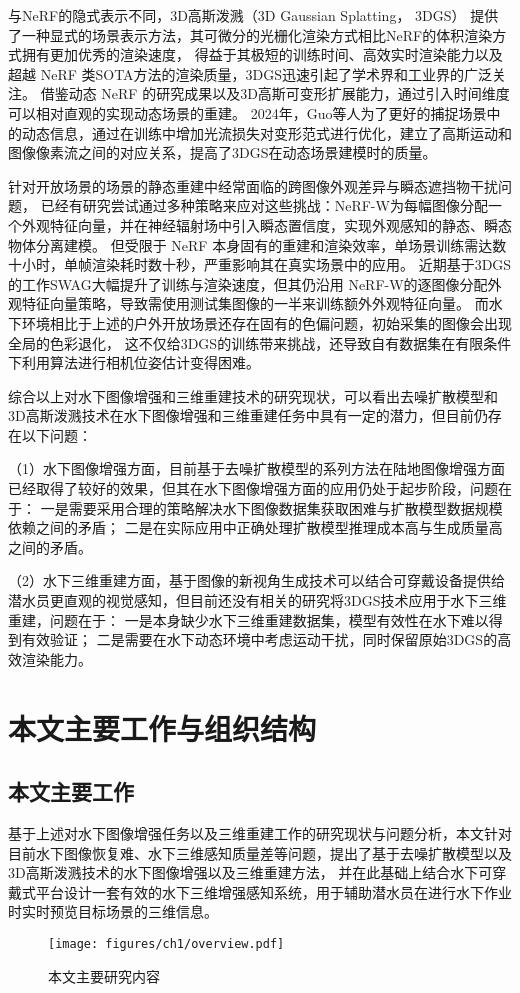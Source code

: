 与NeRF的隐式表示不同，3D高斯泼溅（3D Gaussian Splatting， 3DGS） \cite{3DGS} 提供了一种显式的场景表示方法，其可微分的光栅化渲染方式相比NeRF的体积渲染方式拥有更加优秀的渲染速度，
得益于其极短的训练时间、高效实时渲染能力以及超越 NeRF 类SOTA方法的渲染质量，3DGS迅速引起了学术界和工业界的广泛关注。
借鉴动态 NeRF 的研究成果以及3D高斯可变形扩展能力，通过引入时间维度可以相对直观的实现动态场景的重建\cite{dynamic_3DGS1}\cite{dynamic_3DGS2}\cite{dynamic_3DGS_efficient}\cite{4DGS}。
2024年，Guo等人\cite{flow_2024motion}为了更好的捕捉场景中的动态信息，通过在训练中增加光流损失对变形范式进行优化，建立了高斯运动和图像像素流之间的对应关系，提高了3DGS在动态场景建模时的质量。

针对开放场景的场景的静态重建中经常面临的跨图像外观差异与瞬态遮挡物干扰问题，
已经有研究尝试通过多种策略来应对这些挑战：NeRF-W\cite{nerf-w}为每幅图像分配一个外观特征向量，并在神经辐射场中引入瞬态置信度，实现外观感知的静态、瞬态物体分离建模。
但受限于 NeRF 本身固有的重建和渲染效率，单场景训练需达数十小时，单帧渲染耗时数十秒，严重影响其在真实场景中的应用。
近期基于3DGS 的工作SWAG\cite{swag}大幅提升了训练与渲染速度，但其仍沿用 NeRF-W的逐图像分配外观特征向量策略，导致需使用测试集图像的一半来训练额外外观特征向量。
而水下环境相比于上述的户外开放场景还存在固有的色偏问题，初始采集的图像会出现全局的色彩退化，
这不仅给3DGS的训练带来挑战，还导致自有数据集在有限条件下利用算法进行相机位姿估计变得困难。

综合以上对水下图像增强和三维重建技术的研究现状，可以看出去噪扩散模型和3D高斯泼溅技术在水下图像增强和三维重建任务中具有一定的潜力，但目前仍存在以下问题：

（1）水下图像增强方面，目前基于去噪扩散模型的系列方法在陆地图像增强方面已经取得了较好的效果，但其在水下图像增强方面的应用仍处于起步阶段，问题在于：
一是需要采用合理的策略解决水下图像数据集获取困难与扩散模型数据规模依赖之间的矛盾；
二是在实际应用中正确处理扩散模型推理成本高与生成质量高之间的矛盾。

（2）水下三维重建方面，基于图像的新视角生成技术可以结合可穿戴设备提供给潜水员更直观的视觉感知，但目前还没有相关的研究将3DGS技术应用于水下三维重建，问题在于：
一是本身缺少水下三维重建数据集，模型有效性在水下难以得到有效验证；
二是需要在水下动态环境中考虑运动干扰，同时保留原始3DGS的高效渲染能力。


\section{本文主要工作与组织结构}
\subsection{本文主要工作}
基于上述对水下图像增强任务以及三维重建工作的研究现状与问题分析，本文针对目前水下图像恢复难、水下三维感知质量差等问题，提出了基于去噪扩散模型以及3D高斯泼溅技术的水下图像增强以及三维重建方法，
并在此基础上结合水下可穿戴式平台设计一套有效的水下三维增强感知系统，用于辅助潜水员在进行水下作业时实时预览目标场景的三维信息。
\begin{figure}
    \centering
    \texttt{[image: figures/ch1/overview.pdf]}
    \caption{本文主要研究内容}
    \label{img:overview}
\end{figure}


